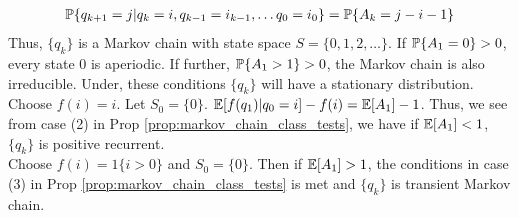 \documentclass[all-lectures.tex]{subfiles}
\begin{document}
\begin{align*}
\P\{q_{k+1} = j|q_k = i,q_{k-1} = i_{k-1}, \dots q_0 = i_0\} = \P\{A_k = j-i-1\}
\end{align*}
Thus, $\{q_k\}$ is a Markov chain with state space $S = \{0,1,2,\dots\}$. If $\P\{A_1 = 0\} > 0$, every state $0$ is aperiodic. If further, $\P\{A_1 > 1\} >0$, the Markov chain is also irreducible. Under, these conditions $\{q_k\}$ will have a stationary distribution. \\
\indent Choose $f(i) = i$. Let $S_0 = \{0\}$. $\E[f(q_1)|q_0 = i] - f(i) = \E[A_1] -1 $. Thus, we see from case (2) in Prop \ref{prop:markov_chain_class_tests}, we have if $\E[A_1] < 1 $, $\{q_k\}$ is positive recurrent.\\
\indent Choose $f(i) = 1\{i>0\}$ and $S_0 = \{0\}$. Then if $\E[A_1] > 1$, the conditions in case (3) in Prop \ref{prop:markov_chain_class_tests} is met and $\{q_k\}$ is transient Markov chain. \\
\end{document}
